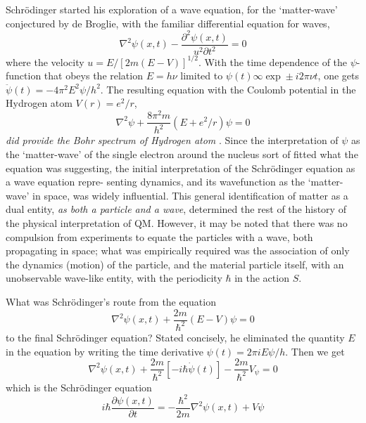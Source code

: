 Schr\"{o}dinger started his exploration of a wave equation, for the `matter-wave' conjectured
by de Broglie, with the familiar differential equation for waves,
\begin{equation*}
\nabla^2 \psi (x,t) - \frac{\partial^2 \psi (x,t)}{u^2 \partial t^2} = 0 \tag{2}\label{c14-eq2}
\end{equation*}
where the velocity $u = E/ [2m(E - V )]^{1/2}$. With the time dependence of the $\psi$-function
that obeys the relation $E = h\nu$ limited to $\psi(t) \infty \exp \pm i2\pi \nu t$, one gets $\ddot{\psi} (t) = -4 \pi^2 E^2 \psi /h^2$.
The resulting equation with the Coulomb potential in the Hydrogen atom $V (r) = e^2 /r$,
\begin{equation*}
\nabla^2 \psi + \frac{8 \pi^2 m}{h^2} (E + e^2 / r) \psi = 0 \tag{3}\label{c14-eq3}
\end{equation*}
\textit{did provide the Bohr spectrum of Hydrogen atom} \cite{chap14-key1}. Since the interpretation of $\psi$ as the
`matter-wave' of the single electron around the nucleus sort of fitted what the equation was
suggesting, the initial interpretation of the Schr\"{o}dinger equation as a wave equation repre-
senting dynamics, and its wavefunction as the `matter-wave' in space, was widely influential.
This general identification of matter as a dual entity, \textit{as both a particle and a wave}, determined the rest of the history of the physical interpretation of QM. However, it may be noted that there was no compulsion from experiments to equate the particles with a wave,
both propagating in space; what was empirically required was the association of only the
dynamics (motion) of the particle, and the material particle itself, with an unobservable
wave-like entity, with the periodicity $\hbar$ in the action $S$.

What was Schr\"{o}dinger's route from the equation
\begin{equation*}
\nabla^2 \psi(x,t) + \frac{2m}{\hbar^2} (E-V) \psi = 0 \tag{4}\label{c14-eq4}
\end{equation*}
to the final Schr\"{o}dinger equation? Stated concisely, he eliminated the quantity $E$ in the
equation by writing the time derivative $\psi(t) = 2\pi i E \psi /h$. Then we get
\begin{equation*}
\nabla^2 \psi (x,t)  + \frac{2m}{\hbar^2} [-i \hbar \dot{\psi} (t)] - \frac{2m}{\hbar^2} V_{\psi} = 0 \tag{5}\label{c14-eq5}
\end{equation*}
which is the Schr\"{o}dinger equation
\begin{equation*}
i \hbar \frac{\partial \psi (x,t)}{\partial t} = - \frac{\hbar^2}{2m} \nabla^2 \psi (x,t) + V \psi  \tag{6}\label{c14-eq6}
\end{equation*}

